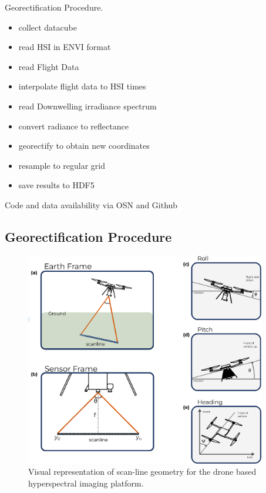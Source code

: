 \documentclass[remotesensing,article,submit,pdftex,moreauthors]{Definitions/mdpi}
\begin{document}
Georectification Procedure.
\begin{itemize}
    \item collect datacube 
    \item read HSI in ENVI format
    \item read Flight Data 
    \item interpolate flight data to HSI times 
    \item read Downwelling irradiance spectrum
    \item convert radiance to reflectance 
    \item georectify to obtain new coordinates 
    \item resample to regular grid
    \item save results to HDF5
\end{itemize}

Code and data availability via OSN and Github



\subsection{Georectification Procedure}


\begin{figure}[H]
    \centering
    \includegraphics[width=10.5cm]{./assets/georectification.eps}
    \caption{Visual representation of scan-line geometry for the drone based hyperspectral imaging platform.}
    \label{fig:georectification}
\end{figure}





\end{document}
